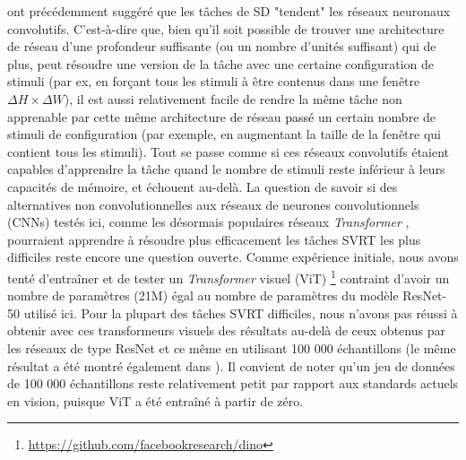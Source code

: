\color{black}
\citet{kim2018not} ont pr\'ec\'edemment sugg\'er\'e que les tâches de SD "tendent" les r\'eseaux neuronaux convolutifs. C'est-\`a-dire que, bien qu'il soit possible de trouver une architecture de r\'eseau d'une profondeur suffisante (ou un nombre d'unit\'es suffisant) qui de plus, peut r\'esoudre une version de la tâche avec une certaine configuration de stimuli (par ex, en forçant tous les stimuli \`a \^etre contenus dans une fen\^etre $\Delta H \times \Delta W$), il est aussi relativement facile de rendre la m\^eme tâche non apprenable par cette m\^eme architecture de r\'eseau \textcolor{black}{passé} un certain nombre de stimuli de configuration (par exemple, en augmentant la taille de la fen\^etre qui contient tous les stimuli). Tout se passe comme si ces r\'eseaux convolutifs \'etaient capables d'apprendre la tâche quand le nombre de stimuli reste inf\'erieur \`a leurs capacit\'es de m\'emoire, et \'echouent au-del\`a. La question de savoir si des alternatives non convolutionnelles aux réseaux de neurones convolutionnels (CNNs) test\'es ici, comme les d\'esormais populaires r\'eseaux \textit{Transformer}  \citep{Dosovitskiy2020-iq,touvron2021training,tolstikhin2021mlp}, pourraient apprendre \`a r\'esoudre plus efficacement les tâches SVRT les plus difficiles reste encore une question ouverte. Comme exp\'erience initiale, nous avons tent\'e d'entraîner et de tester un \textit{Transformer} visuel (ViT) \footnote[1]{\url{https://github.com/facebookresearch/dino}}  \citep{Dosovitskiy2020-iq} contraint d'avoir un nombre de param\`etres (21M) égal au nombre de paramètres du modèle ResNet-50 utilis\'e ici. Pour la plupart des tâches SVRT difficiles, nous n'avons pas réussi \`a obtenir avec ces transformeurs visuels des r\'esultats au-delà de ceux obtenus par les réseaux de type ResNet et ce m\^eme en utilisant 100 000 \'echantillons (le même résultat a été montré \'egalement dans \citet{messina2021recurrent}). Il convient de noter qu'un jeu de donn\'ees de 100 000 \'echantillons reste relativement petit par rapport aux standards actuels en vision, puisque ViT a été entraîné \`a partir de z\'ero.


